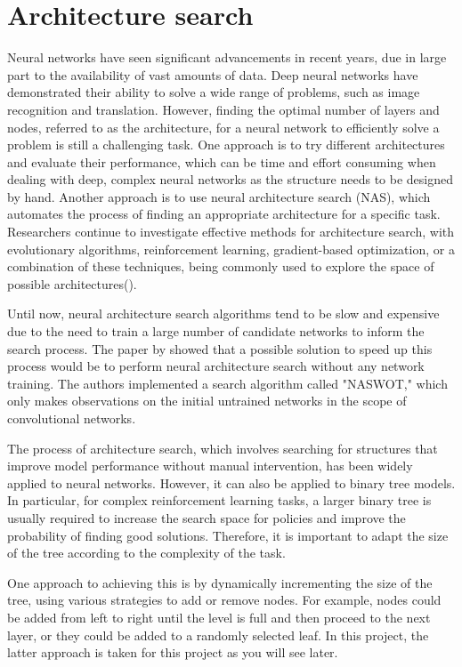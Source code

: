 \section{Architecture search}

Neural networks have seen significant advancements in recent years, due in large part to the availability of vast amounts of data. Deep neural networks have demonstrated their ability to solve a wide range of problems, such as image recognition and translation. However, finding the optimal number of layers and nodes, referred to as the architecture, for a neural network to efficiently solve a problem is still a challenging task. One approach is to try different architectures and evaluate their performance, which can be time and effort consuming when dealing with deep, complex neural networks as the structure needs to be designed by hand. Another approach is to use neural architecture search (NAS), which automates the process of finding an appropriate architecture for a specific task. Researchers continue to investigate effective methods for architecture search, with evolutionary algorithms, reinforcement learning, gradient-based optimization, or a combination of these techniques, being commonly used to explore the space of possible architectures(\cite{elsken_neural_nodate}).

Until now, neural architecture search algorithms tend to be slow and expensive due to the need to train a large number of candidate networks to inform the search process. The paper by \cite{mellor_neural_nodate} showed that a possible solution to speed up this process would be to perform neural architecture search without any network training. The authors implemented a search algorithm called "NASWOT," which only makes observations on the initial untrained networks in the scope of convolutional networks.

The process of architecture search, which involves searching for structures that improve model performance without manual intervention, has been widely applied to neural networks. However, it can also be applied to binary tree models. In particular, for complex reinforcement learning tasks, a larger binary tree is usually required to increase the search space for policies and improve the probability of finding good solutions. Therefore, it is important to adapt the size of the tree according to the complexity of the task.

One approach to achieving this is by dynamically incrementing the size of the tree, using various strategies to add or remove nodes. For example, nodes could be added from left to right until the level is full and then proceed to the next layer, or they could be added to a randomly selected leaf. In this project, the latter approach is taken for this project as you will see later.

